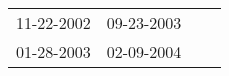 \begin{supertabular}{llll}
 11-22-2002 &  09-23-2003 \\
 01-28-2003 &  02-09-2004 \\
\end{supertabular}
